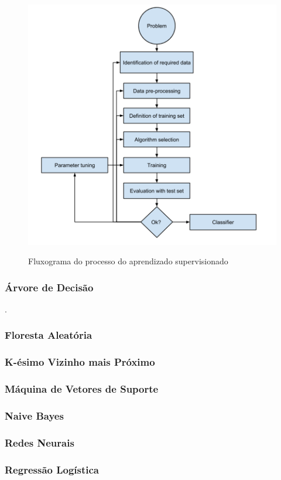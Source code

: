 \documentclass[
	12pt,				%
	oneside,			%
	a4paper,			%
	english,			%
	brazil				%
	]{abntex2ppgsi}
\begin{document}
\begin{figure}[H]%
	\centering
 	  \caption{Fluxograma do processo do aprendizado supervisionado}
		\includegraphics[width=0.8\linewidth]{images/ml_arch.png}
	\label{fig:arch_ml}
\end{figure}

\subsubsection{Árvore de Decisão}.
\subsubsection{Floresta Aleatória}
\subsubsection{K-ésimo Vizinho mais Próximo} 
\subsubsection{Máquina de Vetores de Suporte}
\subsubsection{Naive Bayes}
\subsubsection{Redes Neurais}
\subsubsection{Regressão Logística}
\end{document}

